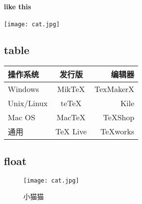 \documentclass[UTF8]{ctexart}
\begin{document}
\paragraph{like this}
\texttt{[image: cat.jpg]}
\subsection{table}
\begin{tabular}{||l|c|r||}
    \hline
   操作系统& 发行版& 编辑器\\
    \hline\hline
   Windows & MikTeX & TexMakerX \\
    \hline
   Unix/Linux & teTeX & Kile \\
    \hline
   Mac OS & MacTeX & TeXShop \\
    \hline
   通用& TeX Live & TeXworks \\
    \hline
\end{tabular}
\subsection{float}
\begin{figure}[h]
    \centering
    \texttt{[image: cat.jpg]}
    \caption{小猫猫}
    \label{fig:cutecat}
\end{figure}
\end{document}

